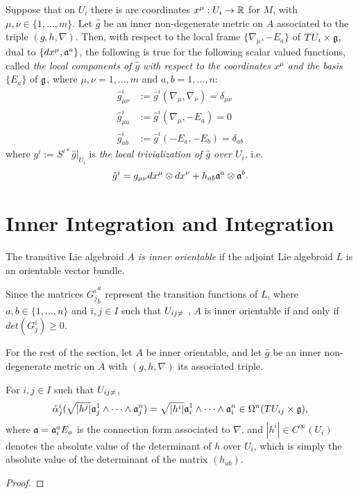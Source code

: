 Suppose that on $U_i$ there is are coordinates $x^\mu: U_i \to \mathbb{R}$ for $M$, with $\mu, \nu \in \{1, \dots, m\}$. Let $\hat g$ be an inner non-degenerate metric on $A$ associated to the triple $(g, h, \nabla)$. Then, with respect to the local frame $\{\nabla_\mu, -E_a\}$ of $TU_i \times \mathfrak{g}$, dual to $\{dx^\mu, \mathfrak{a}^a\}$, the following is true for the following scalar valued functions, called \emph{the local components of $\hat g$ with respect to the coordinates $x^\mu$ and the basis $\{E_a\}$} of $\mathfrak{g}$, where $\mu, \nu = 1, \dots, m$ and $a, b = 1, \dots, n$:
\begin{align*}
    \hat g^i_{\mu \nu}& := \hat g^i(\nabla_\mu, \nabla_\nu) = \delta_{\mu \nu}\\
    \hat g^i_{\mu a} &:= \hat g^i(\nabla_\mu, -E_a)=0\\
    \hat g^i_{ab} &:= \hat g^i(-E_a, -E_b) = \delta_{ab}
\end{align*}
where $g^i := S^{i*}\hat g|_{U_i}$ is \emph{the local trivialization of $\hat g$ over $U_i$}, i.e.
\begin{equation}
    \hat g^i = g_{\mu \nu} dx^\mu\otimes dx^\nu + h_{ab} \mathfrak{a}^a \otimes \mathfrak{a}^b.
\end{equation}


\section{Inner Integration and Integration}

\begin{definition}
The transitive Lie algebroid \emph{$A$ is inner orientable} if the adjoint Lie algebroid $L$ is an orientable vector bundle.
\end{definition}

Since the matrices ${G^i_j}^a_b$ represent the transition functions of $L$, where $a, b \in \{1, \dots, n\}$ and $i, j \in I$ such that $U_{ij \neq \empty}$ , $A$ is inner orientable if and only if $det({G^i_j}) \geq 0$.

For the rest of the section, let $A$ be inner orientable, and let $\hat g$ be an inner non-degenerate metric on $A$ with $(g, h, \nabla)$ its associated triple.

\begin{proposition}\label{propositionInnerVolumeFormIntegrationFOrmGloballyDefinedWell}
For $i, j \in I$ such that $U_{ij \neq \empty}$,
\begin{equation*}
    \hat \alpha^i_j(\sqrt{|h^j|} \mathfrak{a}_j^1 \wedge \cdots \wedge \mathfrak{a}_j^n) = \sqrt{|h^i|} \mathfrak{a}_i^1 \wedge \cdots \wedge \mathfrak{a}_i^n \in \Omega^n(TU_{ij} \times \mathfrak{g}),
\end{equation*}
where $\mathfrak{a} = \mathfrak{a}_i^a E_a$ is the connection form associated to $\nabla$, and $|h^i| \in C^\infty(U_i)$ denotes the absolute value of the determinant of $h$ over $U_i$, which is simply the absolute value of the determinant of the matrix $(h_{ab})$.
\end{proposition}
\begin{proof}
\todo{}
\end{proof}

